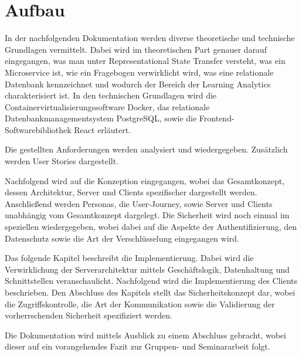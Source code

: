 \section{Aufbau}

In der nachfolgenden Dokumentation werden diverse theoretische und technische Grundlagen vermittelt.
Dabei wird im theoretischen Part genauer darauf eingegangen, was man unter Representational State Transfer versteht, was ein Microservice ist, wie ein Fragebogen verwirklicht wird, was eine relationale Datenbank kennzeichnet und wodurch der Bereich der Learning Analytics charakterisiert ist.
In den technischen Grundlagen wird die Containervirtualisierungssoftware Docker, das relationale Datenbankmanagementsystem PostgreSQL, sowie die Frontend-Softwarebibliothek React erläutert.
 
Die gestellten Anforderungen werden analysiert und wiedergegeben. Zusätzlich werden User Stories dargestellt.

Nachfolgend wird auf die Konzeption eingegangen, wobei das Gesamtkonzept, dessen Architektur, Server und Clients spezifischer dargestellt werden.
Anschließend werden Personas, die User-Journey, sowie Server und Clients unabhängig vom Gesamtkonzept dargelegt.
Die Sicherheit wird noch einmal im speziellen wiedergegeben, wobei dabei auf die Aspekte der Authentifizierung, den Datenschutz sowie die Art der Verschlüsselung eingegangen wird.

Das folgende Kapitel beschreibt die Implementierung.
Dabei wird die Verwirklichung der Serverarchitektur mittels Geschäftslogik, Datenhaltung und Schnittstellen veranschaulicht.
Nachfolgend wird die Implementierung des Clients beschrieben.
Den Abschluss des Kapitels stellt das Sicherheitskonzept dar, wobei die Zugriffskontrolle, die Art der Kommunikation sowie die Validierung der vorherrschenden Sicherheit spezifiziert werden.

Die Dokumentation wird mittels Ausblick zu einem Abschluss gebracht, wobei dieser auf ein vorangehendes Fazit zur Gruppen- und Seminararbeit folgt.
